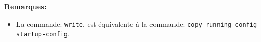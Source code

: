 \documentclass[a4paper]{article}
\begin{document}
\textbf{Remarques:}
\begin{itemize}
    \item La commande: \texttt{write}, est équivalente à la commande: \texttt{copy running-config startup-config}.
\end{itemize}






























\appendix

























\newpage \section{}
\end{document}
